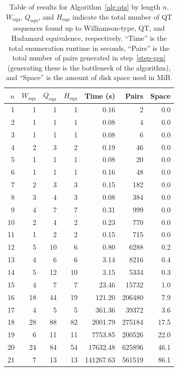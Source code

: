 \documentclass[12pt]{article}
\numberwithin{equation}{section}
\begin{document}
\begin{table}
\caption{\label{table:results} Table of results for Algorithm~\ref{alg:qts} by length $n$.
$W_\text{equ}$, $Q_\text{equ}$, and $H_\text{equ}$ indicate the total number of QT sequences found
up to Williamson-type, QT, and Hadamard equivalence, respectively.
``Time'' is the total enumeration runtime in seconds,
``Pairs'' is the total number of pairs generated in step~\ref{step-gen} (generating these is
the bottleneck of the algorithm),
and ``Space'' is the amount of disk space used in MiB\@.}
\centering
\begin{tabular}{rrrrrrr}
$n$ & $W_{\text{equ}}$ & $Q_{\text{equ}}$ & $H_{\text{equ}}$ & Time (s) & Pairs & Space \\
\hline
1 & 1 & 1 & 1 & 0.16 & 2 & 0.0 \\
2 & 1 & 1 & 1 & 0.08 & 4 & 0.0 \\
3 & 1 & 1 & 1 & 0.08 & 6 & 0.0 \\
4 & 2 & 3 & 2 & 0.19 & 46 & 0.0 \\
5 & 1 & 1 & 1 & 0.08 & 20 & 0.0 \\
6 & 1 & 1 & 1 & 0.16 & 48 & 0.0 \\
7 & 2 & 3 & 3 & 0.15 & 182 & 0.0 \\
8 & 3 & 4 & 3 & 0.08 & 384 & 0.0 \\
9 & 4 & 7 & 7 & 0.31 & 999 & 0.0 \\
10 & 2 & 4 & 2 & 0.23 & 770 & 0.0 \\
11 & 1 & 2 & 2 & 0.15 & 715 & 0.0 \\
12 & 5 & 10 & 6 & 0.80 & 6288 & 0.2 \\
13 & 4 & 6 & 6 & 3.14 & 8216 & 0.4 \\
14 & 5 & 12 & 10 & 3.15 & 5334 & 0.3 \\
15 & 4 & 7 & 7 & 23.46 & 15732 & 1.0 \\
16 & 18 & 44 & 19 & 121.20 & 206480 & 7.9 \\
17 & 4 & 5 & 5 & 361.36 & 39372 & 3.6 \\
18 & 28 & 88 & 82 & 2001.79 & 275184 & 17.5 \\
19 & 6 & 11 & 11 & 7753.85 & 200526 & 22.0 \\
20 & 24 & 84 & 54 & 17632.48 & 625896 & 46.1 \\
21 & 7 & 13 & 13 & 141267.63 & 561519 & 86.1 \\
\end{tabular}
\end{table}
\end{document}
